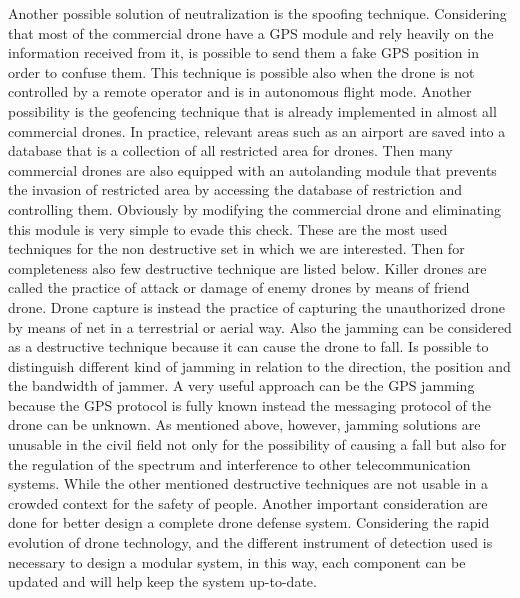 Another possible solution of neutralization is the spoofing technique. Considering that most of the commercial drone have a GPS module and rely heavily on the information received from it, is possible to send them a fake GPS position in order to confuse them. This technique is possible also when the drone is not controlled by a remote operator and is in autonomous flight mode.
Another possibility is the geofencing technique that is already implemented in almost all commercial drones. In practice, relevant areas such as an airport are saved into a database that is a collection of all restricted area for drones. Then many commercial drones are also equipped with an autolanding module that prevents the invasion of restricted area by accessing the database of restriction and controlling them. Obviously by modifying the commercial drone and eliminating this module is very simple to evade this check. These are the most used techniques for the non destructive set in which we are interested. Then for completeness also few destructive  technique are listed below. Killer drones are called the practice of attack or damage of enemy drones by means of friend drone. Drone capture is instead the practice of capturing the unauthorized drone by means of net in a terrestrial or aerial way. Also the jamming can be considered as a destructive technique because it can cause the drone to fall. Is possible to distinguish different kind of jamming in relation to the direction, the position and the bandwidth of jammer. A very useful approach can be the GPS jamming because the GPS protocol is fully known instead the messaging protocol of the drone can be unknown. As mentioned above, however, jamming solutions are unusable in the civil field not only for the possibility of causing a fall but also for the regulation of the spectrum and interference to other telecommunication systems. While the other mentioned destructive techniques are not usable in a crowded context for the safety of people.
Another important consideration are done for better design a complete drone defense system. Considering the rapid evolution of drone technology, and the different instrument of detection used is necessary to design a modular system, in this way, each component can be updated and will help keep the system up-to-date.
